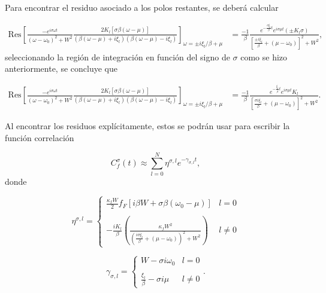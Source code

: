 \begin{appendixs}
Para encontrar el residuo asociado a los polos restantes, se deberá calcular

\begin{align*}
    \text{Res} \left[ \frac{-e^{i\sigma \omega t}}{(\omega - \omega_{0})^{2} + W^{2} } \frac{ 2K_{l}[\sigma \beta (\omega-\mu)] }{ (\beta(\omega-\mu) + i \xi_{l} )(\beta(\omega-\mu) - i \xi_{l})} \right]_{\omega = \pm i \xi_{l}/\beta + \mu} & = \frac{-1}{\beta} \frac{e^{- \frac{\sigma \xi_{l}}{\beta}t} e^{i\sigma \mu t}(\pm K_{l}\sigma )}{ [ \frac{ \pm i\xi_{l}}{\beta} + (\mu - \omega_{0}) ]^{2} + W^{2} } ,
\end{align*}
seleccionando la región de integración en función del signo de $\sigma$ como se hizo anteriormente, se concluye que

\begin{align*}
    \text{Res} \left[ \frac{-e^{i\sigma \omega t}}{(\omega - \omega_{0})^{2} + W^{2} } \frac{ 2K_{l}[\sigma \beta (\omega-\mu)] }{ (\beta(\omega-\mu) + i \xi_{l} )(\beta(\omega-\mu) - i \xi_{l})} \right]_{\omega = \pm i \xi_{l}/\beta + \mu} & = \frac{-1}{\beta} \frac{e^{- \frac{ \xi_{l}}{\beta}t} e^{i\sigma \mu t} K_{l} }{ [ \frac{ \sigma i\xi_{l}}{\beta} + (\mu - \omega_{0}) ]^{2} + W^{2} }. 
\end{align*}

Al encontrar los residuos explícitamente, estos se podrán usar para escribir la función correlación 

\begin{equation}
    C^{\sigma}_{f}(t) \approx \sum_{l=0}^{N} \eta^{\sigma,l} e^{-\gamma_{\sigma,l} t},
    \label{correlationf}
\end{equation}
donde 

\begin{equation*}
    \eta^{\sigma,l} = \left\{ \begin{array}{lc} \frac{\kappa_{f}W}{2} f_{F}[i\beta W + \sigma \beta (\omega_{0}-\mu)]  & l = 0 \\ \\ - \frac{iK_{l}}{\beta} \left(\frac{\kappa_{f}W^{2}}{ (\frac{i\sigma \xi_{l}}{\beta} + (\mu-\omega_{0}))^{2} + W^{2} } \right) &  l \neq 0 \end{array} \right.
\end{equation*}

\begin{equation*}
    \gamma_{\sigma,l} =  \left\{ \begin{array}{lc} W- \sigma i \omega_{0}  & l = 0 \\ \\ \frac{\xi_{l}}{\beta} - \sigma i \mu &  l \neq 0 \end{array} \right..
\end{equation*}


\end{appendixs}
